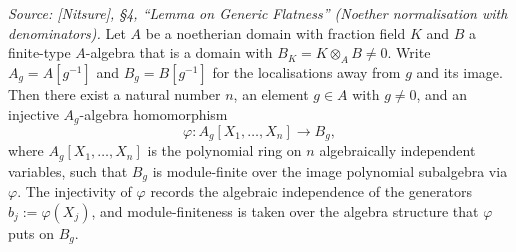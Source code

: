 \begin{lemma}
  \label{lem:gf_noether_clear_denominators}
  \textit{Source: [Nitsure], \S4, ``Lemma on Generic Flatness'' (Noether
  normalisation with denominators).}
  Let \(A\) be a noetherian domain with fraction field \(K\) and \(B\) a finite-type
  \(A\)-algebra that is a domain with \(B_K = K \otimes_A B \ne 0\). Write
  \(A_g = A[g^{-1}]\) and \(B_g = B[g^{-1}]\) for the localisations away from \(g\)
  and its image. Then there exist a natural number \(n\), an element \(g \in A\) with
  \(g \ne 0\), and an injective \(A_g\)-algebra homomorphism
  \[
    \varphi : A_g[X_1, \dots, X_n] \longrightarrow B_g,
  \]
  where \(A_g[X_1, \dots, X_n]\) is the polynomial ring on \(n\) algebraically
  independent variables, such that \(B_g\) is module-finite over the image polynomial
  subalgebra via \(\varphi\). The injectivity of \(\varphi\) records the algebraic
  independence of the generators \(b_j := \varphi(X_j)\), and module-finiteness is
  taken over the algebra structure that \(\varphi\) puts on \(B_g\).
\end{lemma}


